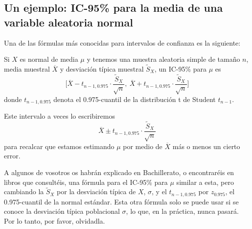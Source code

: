 \documentclass[
  spanish,
  letterpaper,
  DIV=11,
  numbers=noendperiod]{scrreprt}
\begin{document}
\subsection{Un ejemplo: IC-95\% para la media de una variable aleatoria
normal}\label{un-ejemplo-ic-95-para-la-media-de-una-variable-aleatoria-normal}

Una de las fórmulas más conocidas para intervalos de confianza es la
siguiente:

\begin{tcolorbox}[enhanced jigsaw, arc=.35mm, bottomrule=.15mm, bottomtitle=1mm, breakable, colback=white, colbacktitle=quarto-callout-important-color!10!white, colframe=quarto-callout-important-color-frame, coltitle=black, left=2mm, leftrule=.75mm, opacityback=0, opacitybacktitle=0.6, rightrule=.15mm, title=\textcolor{quarto-callout-important-color}{\faExclamation}\hspace{0.5em}{Importante}, titlerule=0mm, toprule=.15mm, toptitle=1mm]

Si \(X\) es normal de media \(\mu\) y tenemos una muestra aleatoria
simple de tamaño \(n\), media muestral \(\overline{X}\) y desviación
típica muestral \(\widetilde{S}_X\), un IC-95\% para \(\mu\) es \[
\Bigg[\overline{X}-t_{n-1,0.975}\cdot \frac{\widetilde{S}_X}{\sqrt{n}},\ \overline{X}+t_{n-1,0.975}\cdot\frac{\widetilde{S}_X}{\sqrt{n}}\Bigg]
\] donde \(t_{n-1,0.975}\) denota el 0.975-cuantil de la distribución t
de Student \(t_{n-1}\).

\end{tcolorbox}

Este intervalo a veces lo escribiremos \[
\overline{X}\pm t_{n-1,0.975}\cdot \frac{\widetilde{S}_X}{\sqrt{n}}
\] para recalcar que estamos estimando \(\mu\) por medio de
\(\overline{X}\) más o menos un cierto error.

\begin{tcolorbox}[enhanced jigsaw, arc=.35mm, bottomrule=.15mm, bottomtitle=1mm, breakable, colback=white, colbacktitle=quarto-callout-warning-color!10!white, colframe=quarto-callout-warning-color-frame, coltitle=black, left=2mm, leftrule=.75mm, opacityback=0, opacitybacktitle=0.6, rightrule=.15mm, title=\textcolor{quarto-callout-warning-color}{\faExclamationTriangle}\hspace{0.5em}{Advertencia}, titlerule=0mm, toprule=.15mm, toptitle=1mm]

A algunos de vosotros os habrán explicado en Bachillerato, o
encontraréis en libros que consultéis, una fórmula para el IC-95\% para
\(\mu\) similar a esta, pero cambiando la \(\widetilde{S}_X\) por la
desviación típica de \(X\), \(\sigma\), y el \(t_{n-1,0.975}\) por
\(z_{0.975}\), el 0.975-cuantil de la normal estándar. Esta otra fórmula
solo se puede usar si se conoce la desviación típica poblacional
\(\sigma\), lo que, en la práctica, nunca pasará. Por lo tanto, por
favor, olvidadla.

\end{tcolorbox}
\end{document}
